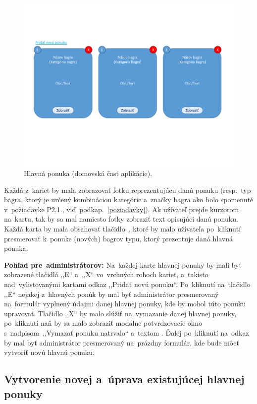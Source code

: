 \begin{figure}[H]\centering
\includegraphics[width=140mm]{../img/UI concept/main offer cards}
\caption{Hlavná ponuka (domovská časť aplikácie).}
\label{main offer cards}
\end{figure}

Každá z~kariet by mala zobrazovať fotku reprezentujúcu danú ponuku (resp.~typ bagra, ktorý je určený kombináciou kategórie a~značky bagra ako bolo spomenuté v~požiadavke P2.1., viď~podkap.~\ref{poziadavky}). Ak užívateľ prejde kurzorom na~kartu, tak by sa mal namiesto fotky zobraziť text opisujúci danú ponuku. Každá karta by mala obsahovať tlačidlo~, ktoré by malo užívateľa po~kliknutí presmerovať k~ponuke (nových) bagrov typu, ktorý prezentuje daná hlavná ponuka.

\textbf{Pohľad pre~administrátorov:} Na~každej karte hlavnej ponuky by mali byť zobrazené tlačidlá ,,E`` a~,,X`` vo~vrchných rohoch kariet, a~takisto nad~vylistovanými kartami odkaz ,,Pridať novú ponuku``. Po~kliknutí na~tlačidlo ,,E`` nejakej z~hlavných ponúk by mal byť administrátor presmerovaný na~formulár vyplnený údajmi danej hlavnej ponuky, kde by mohol túto ponuku upravovať. Tlačidlo ,,X`` by malo slúžiť na~vymazanie danej hlavnej ponuky, po~kliknutí naň by sa malo zobraziť modálne potvrdzovacie okno s~nadpisom~,,Vymazať ponuku natrvalo`` a~textom . Ďalej po~kliknutí na~odkaz  by mal byť administrátor presmerovaný na~prázdny formulár, kde bude môcť vytvoriť novú hlavnú ponuku.
\newpage
\subsection{Vytvorenie novej a~úprava existujúcej hlavnej ponuky}
\label{vytvorenie novej a uprava existujucej hlavnej ponuky}

